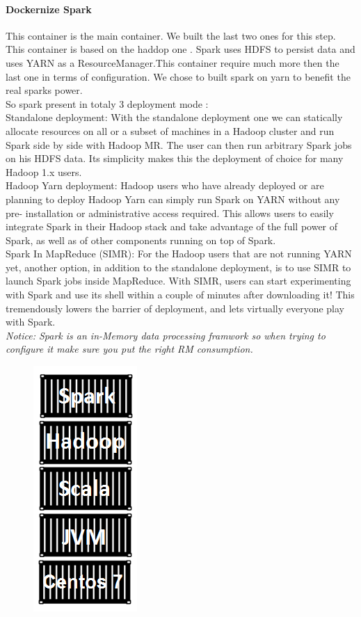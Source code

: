 \paragraph{Dockernize Spark}
\label{sec:sec01}
This container is the main container. We built the last two ones for this step. This container is based on the haddop one . Spark uses HDFS to persist data
and uses YARN as a ResourceManager.This container require much more then the last one in terms of configuration. We chose to built spark on yarn to benefit the real sparks power. \\
So spark present in totaly 3 deployment mode :\\
Standalone deployment: With the standalone deployment one we can statically
allocate resources on all or a subset of machines in a Hadoop cluster and run
Spark side by side with Hadoop MR. The user can then run arbitrary Spark jobs
on his HDFS data. Its simplicity makes this the deployment of choice for many
Hadoop 1.x users.\\
Hadoop Yarn deployment: Hadoop users who have already deployed or are
planning to deploy Hadoop Yarn can simply run Spark on YARN without any pre-
installation or administrative access required. This allows users to easily
integrate Spark in their Hadoop stack and take advantage of the full power of
Spark, as well as of other components running on top of Spark.\\
Spark In MapReduce (SIMR): For the Hadoop users that are not running YARN
yet, another option, in addition to the standalone deployment, is to use SIMR to
launch Spark jobs inside MapReduce. With SIMR, users can start experimenting
with Spark and use its shell within a couple of minutes after downloading it! This
tremendously lowers the barrier of deployment, and lets virtually everyone play
with Spark.\\
\textit{
Notice:
 Spark is an in-Memory data processing framwork so when trying to configure it make sure you put the right RM consumption.
}
\begin{figure}[h!]
	\centering
	\includegraphics[height=0.2\textheight]{fig01/SparkFinalContainer}
	\label{fig:FilialesEtClients}
\end{figure}
